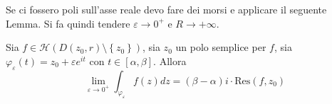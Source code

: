 Se ci fossero poli sull'asse reale devo fare dei morsi e applicare il seguente Lemma. Si fa quindi tendere $\varepsilon \rightarrow 0^{+}$ e $R\rightarrow +\infty $.
\begin{thm}
 Sia $f\in \mathcal{H}\left( D\left( z_{0} ,r\right) \setminus \left\{z_{0}\right\}\right)$, sia $z_{0}$ un polo semplice per $f$, sia $\varphi _{\varepsilon }\left( t\right) =z_{0} +\varepsilon e^{it}$ con $t\in \left[ \alpha ,\beta \right]$. Allora
\begin{equation*}
\lim _{\varepsilon \rightarrow 0^{+}}\int _{\varphi _{\varepsilon }} f\left( z\right) dz=\left( \beta -\alpha \right) i\cdotp \mathrm{Res}\left( f,z_{0}\right)
\end{equation*}
\end{thm}
\begin{figure}[htpb]
	\centering
{} %

\begin{tikzpicture}[x=0.75pt,y=0.75pt,yscale=-1,xscale=1]


\end{tikzpicture}
\end{figure}

